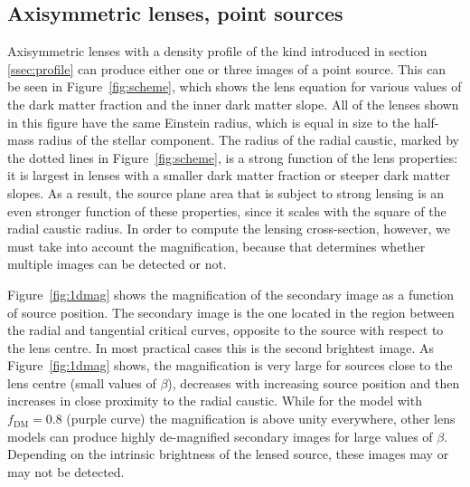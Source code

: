 \documentclass{aa}
\def\crosssect{\sigma_\mathrm{{SL}}}
\def\Fref#1{Figure~\ref{#1}\xspace}
\begin{document}
\subsection{Axisymmetric lenses, point sources}\label{ssec:axisymmpoint}

Axisymmetric lenses with a density profile of the kind introduced in section \ref{ssec:profile} can produce either one or three images of a point source.
This can be seen in \Fref{fig:scheme}, which shows the lens equation for various values of the dark matter fraction and the inner dark matter slope.
All of the lenses shown in this figure have the same Einstein radius, which is equal in size to the half-mass radius of the stellar component.
The radius of the radial caustic, marked by the dotted lines in \Fref{fig:scheme}, is a strong function of the lens properties: it is largest in lenses with a smaller dark matter fraction or steeper dark matter slopes.
As a result, the source plane area that is subject to strong lensing is an even stronger function of these properties, since it scales with the square of the radial caustic radius.
In order to compute the lensing cross-section, however, we must take into account the magnification, because that determines whether multiple images can be detected or not.

\Fref{fig:1dmag} shows the magnification of the secondary image as a function of source position. The secondary image is the one located in the region between the radial and tangential critical curves, opposite to the source with respect to the lens centre. In most practical cases this is the second brightest image.
As \Fref{fig:1dmag} shows, the magnification is very large for sources close to the lens centre (small values of $\beta$), decreases with increasing source position and then increases in close proximity to the radial caustic.
While for the model with $f_{\mathrm{DM}}=0.8$ (purple curve) the magnification is above unity everywhere, other lens models can produce highly de-magnified secondary images for large values of $\beta$.
Depending on the intrinsic brightness of the lensed source, these images may or may not be detected.
\end{document}
